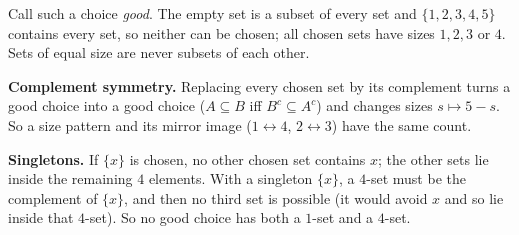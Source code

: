 Call such a choice \emph{good}. The empty set is a subset of every set and $\{1,2,3,4,5\}$ contains every set, so neither can be chosen; all chosen sets have sizes $1,2,3$ or $4$. Sets of equal size are never subsets of each other.

\textbf{Complement symmetry.} Replacing every chosen set by its complement turns a good choice into a good choice ($A\subseteq B$ iff $B^c\subseteq A^c$) and changes sizes $s\mapsto5-s$. So a size pattern and its mirror image ($1\leftrightarrow4$, $2\leftrightarrow3$) have the same count.

\textbf{Singletons.} If $\{x\}$ is chosen, no other chosen set contains $x$; the other sets lie inside the remaining $4$ elements. With a singleton $\{x\}$, a $4$-set must be the complement of $\{x\}$, and then no third set is possible (it would avoid $x$ and so lie inside that $4$-set). So no good choice has both a $1$-set and a $4$-set.

